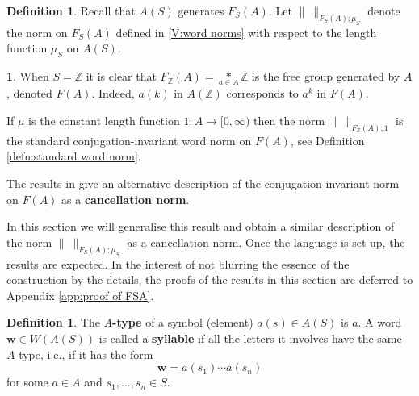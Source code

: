 \documentclass[12pt]{amsart}
\theoremstyle{definition}
\newtheorem{defn}[prop]{Definition}
\newtheorem{void}[prop]{}
\def\ZZ{\ensuremath{\mathbb{Z}}}
\newcommand{\B}[1]{\mathbf{#1}}
\def\Free{F}
\begin{document}

\begin{defn}\label{def:mu word norm}
Recall that $A(S)$ generates $\Free_S(A)$.
Let $\| \ \|_{\Free_S(A);\mu_S}$ denote the norm on $\Free_S(A)$ defined in \ref{V:word norms} with respect to the length function $\mu_S$ on $A(S)$.
\end{defn}






\begin{void}\label{V:when S=Z its F(A)}
When $S=\ZZ$ it is clear that $\Free_\ZZ(A)=\underset{a \in A}{*} \ZZ$ is the free group generated by $A$, denoted $F(A)$.
Indeed, $a(k)$ in $A(\ZZ)$ corresponds to $a^k$ in $\Free(A)$. 

If $\mu$ is the constant length function $1 \colon A \to [0,\infty)$ then the norm $\| \ \|_{\Free_\ZZ(A);1}$ is the standard conjugation-invariant word norm on $\Free(A)$, see Definition \ref{defn:standard word norm}.
\end{void}


The results in \cite{MR3426433} give an alternative description of the conjugation-invariant norm on $\Free(A)$ as a {\bf cancellation norm}.

In this section we will generalise this result and obtain a similar description of the norm $\| \ \|_{\Free_S(A);\mu_S}$ as a cancellation norm.
Once the language is set up, the results are expected.
In the interest of not blurring the essence of the construction by the details, the proofs of the results in this section are deferred to Appendix \ref{app:proof of FSA}.




\begin{defn}\label{defn:syllables}
The {\bf $A$-type} of a symbol (element) $a(s) \in A(S)$ is $a$.
A word $\B w \in W(A(S))$ is called a {\bf syllable} if all the letters it involves have the same $A$-type, i.e., if it has the form
\[
\B w = a(s_1) \cdots a(s_n)
\]
for some $a \in A$ and $s_1,\dots,s_n \in S$.
\end{defn}
\end{document}
